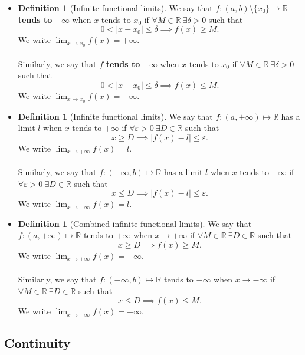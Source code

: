 \documentclass{article}
\newcommand{\R}{\mathbb{R}}
\newcommand{\?}{\stackrel{?}{=}}
\theoremstyle{definition} %
\newtheorem{definition}[subsection]{Definition} %
\begin{document}
\begin{itemize}
    \item[]
    \begin{definition}[Infinite functional limits]
        We say that $f: (a, b) \setminus \{x_0\} \mapsto \R$ \textbf{tends to} $+\infty$ when $x$ tends to $x_0$ if $\forall M \in \R \ \exists \delta > 0$ such that
        $$0 < |x - x_0| \leq \delta \implies f(x) \geq M.$$
        We write $\lim_{x \to x_0} f(x) = +\infty$. \\\\
        Similarly, we say that $f$ \textbf{tends to } $-\infty$ when $x$ tends to $x_0$ if $\forall M \in \R \ \exists \delta > 0$ such that
        $$0 < |x - x_0| \leq \delta \implies f(x) \leq M.$$
        We write $\lim_{x \to x_0} f(x) = -\infty$.
    \end{definition}
    \item[]
    \begin{definition}[Infinite functional limits]
        We say that $f: (a, +\infty) \mapsto \R$ has a limit $l$ when $x$ tends to $+\infty$ if $\forall \varepsilon > 0 \ \exists D \in \R$ such that
        $$x \geq D \implies |f(x) - l| \leq \varepsilon.$$
        We write $\lim_{x \to +\infty} f(x) = l$. \\\\
        Similarly, we say that $f: (-\infty, b) \mapsto \R$ has a limit $l$ when $x$ tends to $-\infty$ if $\forall \varepsilon > 0 \ \exists D \in \R$ such that
        $$x \leq D \implies |f(x) - l| \leq \varepsilon.$$
        We write $\lim_{x \to -\infty} f(x) = l$.
    \end{definition}
    \item[]
    \begin{definition}[Combined infinite functional limits]
        We say that $f: (a, +\infty) \mapsto \R$ tends to $+\infty$ when $x \rightarrow +\infty$ if $\forall M \in \R \ \exists D \in \R$ such that
        $$x \geq D \implies f(x) \geq M.$$
        We write $\lim_{x \to +\infty} f(x) = +\infty$. \\\\
        Similarly, we say that $f: (-\infty, b) \mapsto \R$ tends to $-\infty$ when $x \rightarrow -\infty$ if $\forall M \in \R \ \exists D \in \R$ such that
        $$x \leq D \implies f(x) \leq M.$$
        We write $\lim_{x \to -\infty} f(x) = -\infty$.
    \end{definition}
\end{itemize}

\subsection{Continuity}
\end{document}
